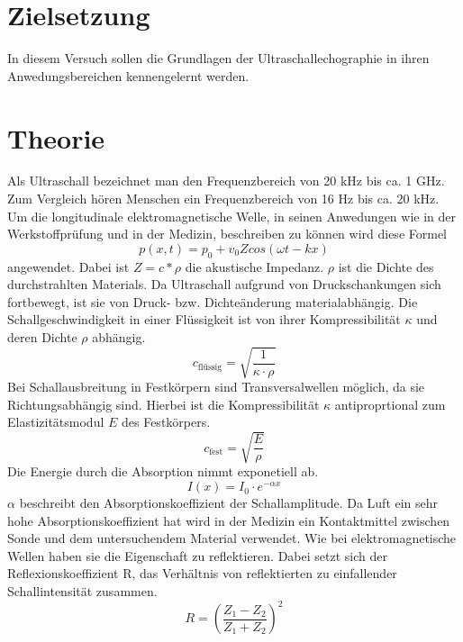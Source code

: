 \section{Zielsetzung}
In diesem Versuch sollen die Grundlagen der Ultraschallechographie
in ihren Anwedungsbereichen kennengelernt werden.
\section{Theorie}
Als Ultraschall bezeichnet man den Frequenzbereich von 20 kHz bis ca. 1 GHz.
Zum Vergleich hören Menschen ein Frequenzbereich von 16 Hz bis ca. 20 kHz.
Um die longitudinale elektromagnetische Welle, in seinen Anwedungen wie in der Werkstoffprüfung
und in der Medizin, beschreiben zu können wird diese Formel
\begin{equation}
  p(x,t)= p_0 + v_0 Z cos(\omega t - k x)
  \label{eq:1}
\end{equation}
angewendet.
Dabei ist $Z = c* \rho$ die akustische Impedanz. $\rho$ ist die Dichte des durchstrahlten Materials.
Da Ultraschall aufgrund von Druckschankungen sich fortbewegt, ist sie von Druck- bzw. Dichteänderung materialabhängig.
Die Schallgeschwindigkeit in einer Flüssigkeit ist von ihrer Kompressibilität $\kappa$ und deren Dichte $\rho$
abhängig.
\begin{equation}
  c_{\text{flüssig}} = \sqrt{\frac{1}{\kappa \cdot \rho}}
  \label{eq:2}
\end{equation}
Bei Schallausbreitung in Festkörpern sind Transversalwellen möglich, da sie Richtungsabhängig sind.
Hierbei ist die Kompressibilität $\kappa$ antiproprtional zum Elastizitätsmodul $E$ des Festkörpers.
\begin{equation}
  c_{\text{fest}} = \sqrt{\frac{E}{\rho}}
  \label{eq:3}
\end{equation}
Die Energie durch die Absorption nimmt exponetiell ab.
\begin{equation}
  I(x) =I_0 \cdot e^{-\alpha x}
  \label{eq:4}
\end{equation}
$\alpha$ beschreibt den Absorptionskoeffizient der Schallamplitude.
Da Luft ein sehr hohe Absorptionskoeffizient hat wird in der Medizin ein Kontaktmittel
zwischen Sonde und dem untersuchendem Material verwendet.
Wie bei elektromagnetische Wellen haben sie die Eigenschaft zu reflektieren.
Dabei setzt sich der Reflexionskoeffizient R, das Verhältnis von reflektierten zu einfallender Schallintensität zusammen.
\begin{equation}
  R = (\frac{Z_1 - Z_2} {Z_1 + Z_2})^2
  \label{eq:5}
\end{equation}
